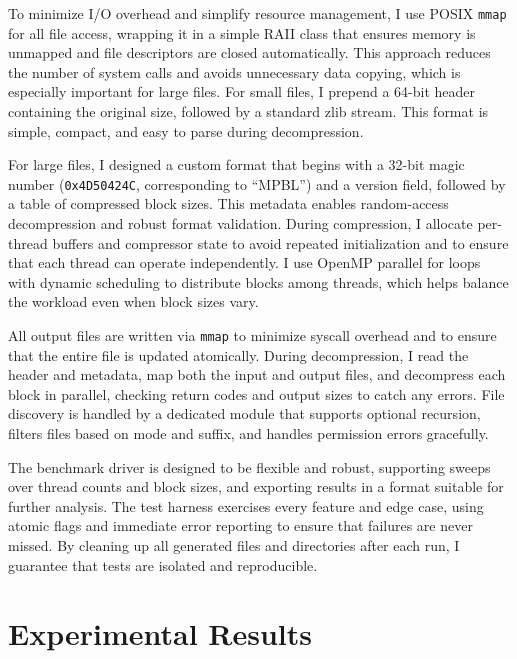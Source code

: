 \documentclass[10pt]{article}
\begin{document}
To minimize I/O overhead and simplify resource management, I use POSIX \texttt{mmap} for all file access, wrapping it in a simple RAII class that ensures memory is unmapped and file descriptors are closed automatically. This approach reduces the number of system calls and avoids unnecessary data copying, which is especially important for large files. For small files, I prepend a 64-bit header containing the original size, followed by a standard zlib stream. This format is simple, compact, and easy to parse during decompression.

For large files, I designed a custom format that begins with a 32-bit magic number (\texttt{0x4D50424C}, corresponding to “MPBL”) and a version field, followed by a table of compressed block sizes. This metadata enables random-access decompression and robust format validation. During compression, I allocate per-thread buffers and compressor state to avoid repeated initialization and to ensure that each thread can operate independently. I use OpenMP parallel for loops with dynamic scheduling to distribute blocks among threads, which helps balance the workload even when block sizes vary.

All output files are written via \texttt{mmap} to minimize syscall overhead and to ensure that the entire file is updated atomically. During decompression, I read the header and metadata, map both the input and output files, and decompress each block in parallel, checking return codes and output sizes to catch any errors. File discovery is handled by a dedicated module that supports optional recursion, filters files based on mode and suffix, and handles permission errors gracefully.

The benchmark driver is designed to be flexible and robust, supporting sweeps over thread counts and block sizes, and exporting results in a format suitable for further analysis. The test harness exercises every feature and edge case, using atomic flags and immediate error reporting to ensure that failures are never missed. By cleaning up all generated files and directories after each run, I guarantee that tests are isolated and reproducible.

\section{Experimental Results}
\end{document}

